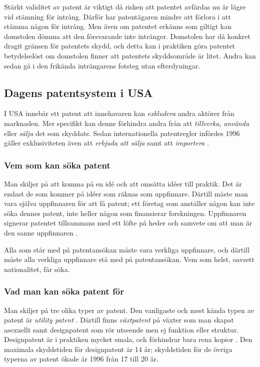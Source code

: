 
Stärkt validitet av patent är viktigt då risken att patentet avfärdas nu är lägre vid stämning för
intrång. Därför har patentägaren mindre att förlora i att stämma någon för intrång. Men
även om patentet erkänns som giltigt kan domstolen dömma att den försvarande inte intränger.
Domstolen har då konkret dragit gränsen för patentets skydd, och detta kan i praktiken göra patentet
betydelselöst om domstolen finner att patentets skyddsområde är litet. Andra kan sedan gå i den frikända
inträngarens fotsteg utan efterdyningar\cite{henry}.




\subsection{Dagens patentsystem i USA}

I USA innebär ett patent att innehavaren kan \emph{exkludera} andra aktörer från marknaden. Mer specifikt kan denne förhindra andra från att \emph{tillverka}, \emph{använda} eller \emph{sälja} det som skyddats. Sedan internationella patentregler infördes 1996 gäller exklusiviteten även att \emph{erbjuda att sälja} samt att \emph{importera} \cite{cmu-overview}.

\subsubsection{Vem som kan söka patent}
Man skiljer på att komma på en idé och att omsätta idéer till praktik. Det är endast de som kommer på idéer som räknas som uppfinnare. Därtill måste man vara själva uppfinnaren för att få patent; ett företag som anställer någon kan inte söka dennes patent, inte heller någon som finansierar forskningen. Uppfinnaren signerar patentet tillsammans med ett löfte på heder och samvete om att man är den sanne uppfinnaren \cite{cmu-overview}.

Alla som står med på patentansökan måste vara verkliga uppfinnare, och därtill måste alla verkliga uppfinnare stå med på patentansökan. Vem som helst, oavsett nationalitet, får söka.

\subsubsection{Vad man kan söka patent för}
Man skiljer på tre olika typer av patent. Den vanligaste och mest kända typen av patent är \emph{utility patent} \cite{cmu-overview}.
Därtill finns \emph{växtpatent} på växter som man skapat asexuellt samt designpatent som rör utseende men ej funktion eller struktur. Designpatent är i praktiken mycket smala, och förhindrar bara rena kopior . Den maximala skyddstiden för designpatent är 14 år; skyddstiden för de övriga typerna av patent ökade år 1996 från 17 till 20 år.

